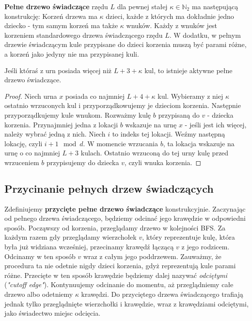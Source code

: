 \begin{definition}
	\textbf{Pełne drzewo świadczące} rzędu \(L\) dla pewnej stałej \(\kappa \in \mathbb{N}_2\) ma następującą konstrukcję:
	Korzeń drzewa ma \(\kappa\) dzieci, każde z których ma dokładnie jedno dziecko - tym samym korzeń ma także \(\kappa\) wnuków.
	Każdy z wnuków jest korzeniem standardowego drzewa świadczącego rzędu \(L\).
	W dodatku, w pełnym drzewie świadczącym kule przypisane do dzieci korzenia muszą być parami różne, a korzeń jako jedyny nie ma przypisanej kuli.
\end{definition}

\begin{lemma}
	Jeśli któraś z urn posiada więcej niż \(L + 3 + \kappa\) kul, to istnieje aktywne pełne drzewo świadczące.
\end{lemma}
\begin{proof}
	Niech urna \(x\) posiada co najmniej \(L + 4 + \kappa\) kul. Wybieramy z niej \(\kappa\) ostatnio wrzuconych kul i przyporządkowujemy je dzieciom korzenia.
	Następnie przyporządkujemy kule wnukom. Rozważmy kulę \(b\) przypisaną do \(v\) - dziecka korzenia. Przynajmniej jedna z lokacji \(b\) wskazuje na urnę \(x\) - jeśli jest ich więcej, należy wybrać jedną z nich.
	Niech \(i\) to indeks tej lokacji. Weźmy następną lokację, czyli \(i+1 \mod d\). W momencie wrzucania \(b\), ta lokacja wskazuje na urnę o co najmniej \(L+3\) kulach.
	Ostatnio wrzuconą do tej urny kulę przed wrzuceniem \(b\) przypisujemy do dziecka \(v\), czyli wnuka korzenia.
\end{proof}

\subsection*{Przycinanie pełnych drzew świadczących}

\begin{definition}
	Zdefiniujemy \textbf{przycięte pełne drzewo świadczące} konstrukcyjnie. Zaczynając od pełnego drzewa świadczącego, będziemy odcinać jego krawędzie w odpowiedni sposób.
	Począwszy od korzenia, przeglądamy drzewo w kolejności BFS.
	Za każdym razem gdy przeglądamy wierzchołek \(v\), który reprezentuje kulę, która była już widziana wcześniej, przecinamy krawędź łączącą \(v\) z jego rodzicem.
	Odcinamy w ten sposób \(v\) wraz z całym jego poddrzewem. Zauważmy, że procedura ta nie odetnie nigdy dzieci korzenia, gdyż reprezentują kule parami różne.
	Przecięte w ten sposób krawędzie będziemy dalej nazywać \textit{odciętymi} (\textit{"cutoff edge"}). Kontynuujemy odcinanie do momentu, aż przeglądniemy całe drzewo albo odetniemy \(\kappa\) krawędzi.
	Do przyciętego drzewa świadczącego trafiają jednak tylko przeglądnięte wierzchołki i krawędzie, wraz z krawędziami odciętymi, jako świadectwo miejsc odcięcia.
\end{definition}

